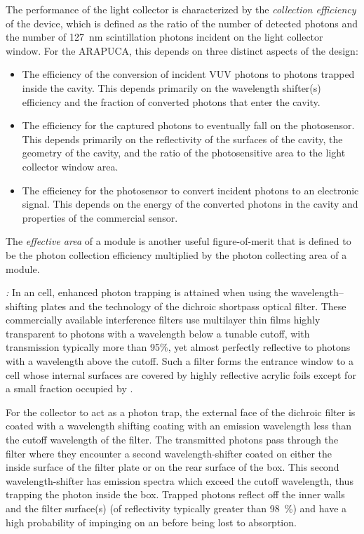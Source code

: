 The performance of the light collector is characterized by the \emph{collection efficiency} of the device, which is defined as the ratio of the number of detected photons and the number of \SI{127}{nm} scintillation photons incident on the light collector window.  For the ARAPUCA, this depends on three distinct aspects of the design:
\begin{itemize}
    \item The efficiency of the conversion of incident VUV photons to photons trapped inside the cavity. This depends primarily on the wavelength shifter(s) efficiency and the fraction of converted photons that enter the cavity.
    \item The efficiency for the captured photons to eventually fall on the photosensor. This depends primarily on the reflectivity of the surfaces of the cavity, the geometry of the cavity, and the ratio of the photosensitive area to the light collector window area.
    \item The efficiency for the photosensor to convert incident photons to an electronic signal. This depends on the energy of the converted photons in the cavity and properties of the commercial sensor.
\end{itemize}
The \emph{effective area} of a  module is another useful figure-of-merit that is defined to be the photon collection efficiency multiplied by the photon collecting area of a  module. 

\textit{:} In an  cell, enhanced photon trapping is attained when using the wavelength--shifting plates and the technology of the dichroic shortpass optical filter. These commercially available interference filters use multilayer thin films highly transparent to photons with a wavelength below a tunable cutoff, 
with transmission typically more than 95\%, yet almost perfectly reflective to photons with a wavelength above the cutoff.  Such a filter forms the entrance window to a cell whose internal surfaces are covered by highly reflective acrylic foils
except for a small fraction occupied by .

For the collector to act as a photon trap, the external face of the dichroic filter is coated with a wavelength shifting coating with an emission wavelength less than the cutoff wavelength of the filter. 
The transmitted photons pass through the filter where they encounter a second wavelength-shifter coated on either the inside surface of the filter plate or on the rear surface of the box.
This second wavelength-shifter has emission spectra which exceed the cutoff wavelength, thus trapping the photon inside the box.
Trapped photons reflect off the inner walls and the filter surface(s) (of reflectivity typically greater than \SI{98}{\%}) 
and have a high probability of impinging on an  before being lost to absorption. 

